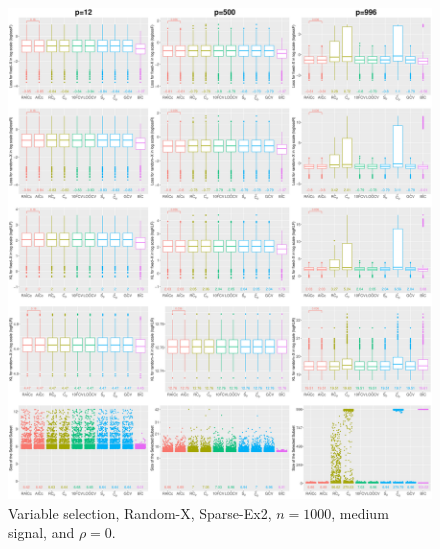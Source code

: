 \begin{figure}[!ht]
\centering
\includegraphics[width=\textwidth]{figures/supplement/randomx/subset_selection/Sparse-Ex2_n1000_msnr_rho0.eps}
\caption{Variable selection, Random-X, Sparse-Ex2, $n=1000$, medium signal, and $\rho=0$.}
\end{figure}
\clearpage
